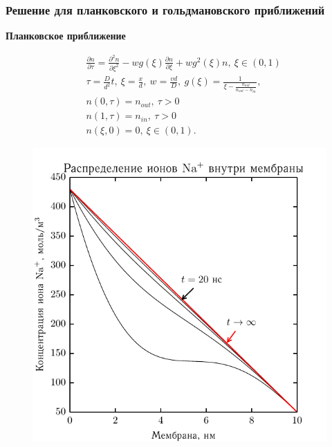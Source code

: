 \documentclass[10pt]{beamer}
\newcommand{\pder}[2] {\frac{\partial #1}{\partial #2}}
\newcommand{\ppder}[2]{\frac{\partial^2 #1}{\partial {#2}^2}}
\begin{document}
  \begin{frame}
      \frametitle{Решение для планковского и гольдмановского приближений}
      \textbf{Планковское приближение}

      \begin{minipage}{.3\textwidth}
          \begingroup
\everymath{\scriptstyle}
\scriptsize
        \begin{align*}
        & \pder{n}{\tau} = \ppder{n}{\xi} - wg(\xi)\pder{n}{\xi} + wg^2(\xi)n,
            \ \xi\in(0,1) \\
        & \tau = \frac{D}{d^2}t,\ \xi = \frac{x}{d},\ w = \frac{vd}{D},
        \ g(\xi) = \frac{1}{\xi - \frac{n_{out}}{n_{out} - n_{in}}},\\
        & n(0, \tau) = n_{out},\ \tau>0 \\
        & n(1, \tau) = n_{in},\ \tau>0 \\
        & n(\xi, 0) = 0,\ \xi\in(0,1).
    \end{align*}
\endgroup
\end{minipage}\hfill
      \begin{minipage}{.3\textwidth}
    \begin{figure}[H]
    \begin{center}
        \includegraphics[width=\textwidth]{../plots/linear_conc}
    \end{center}
    \end{figure}
\end{minipage}



\end{frame}
\end{document}
